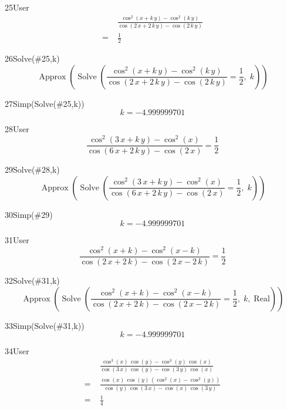 \begin{espr}{25}{User}{\verificata}
\begin{align*}
& \frac{\cos^{2}\!\left(x + k\, y\right) - \cos^{2}\!\left(k\, y\right)}{\cos\!\left(2\, x + 2\, k\, y\right) - \cos\!\left(2\, k\, y\right)} \\
=\;& \frac{1}{2}
\end{align*}
\end{espr}
\begin{espr}{26}{Solve(\#25,k)}{}
\[
\operatorname{Approx}\!\left(\operatorname{Solve}\!\left(\frac{\cos^{2}\!\left(x + k\, y\right) - \cos^{2}\!\left(k\, y\right)}{\cos\!\left(2\, x + 2\, k\, y\right) - \cos\!\left(2\, k\, y\right)} = \frac{1}{2},\; k\right)\right)
\]
\end{espr}
\begin{espr}{27}{Simp(Solve(\#25,k))}{}
\[
k = -4.999999701
\]
\end{espr}
\begin{espr}{28}{User}{\verificata}
\[
\frac{\cos^{2}\!\left(3\, x + k\, y\right) - \cos^{2}\!\left(x\right)}{\cos\!\left(6\, x + 2\, k\, y\right) - \cos\!\left(2\, x\right)} = \frac{1}{2}
\]
\end{espr}
\begin{espr}{29}{Solve(\#28,k)}{}
\[
\operatorname{Approx}\!\left(\operatorname{Solve}\!\left(\frac{\cos^{2}\!\left(3\, x + k\, y\right) - \cos^{2}\!\left(x\right)}{\cos\!\left(6\, x + 2\, k\, y\right) - \cos\!\left(2\, x\right)} = \frac{1}{2},\; k\right)\right)
\]
\end{espr}
\begin{espr}{30}{Simp(\#29)}{}
\[
k = -4.999999701
\]
\end{espr}
\begin{espr}{31}{User}{\verificata}
\[
\frac{\cos^{2}\!\left(x + k\right) - \cos^{2}\!\left(x - k\right)}{\cos\!\left(2\, x + 2\, k\right) - \cos\!\left(2\, x - 2\, k\right)} = \frac{1}{2}
\]
\end{espr}
\begin{espr}{32}{Solve(\#31,k)}{}
\[
\operatorname{Approx}\!\left(\operatorname{Solve}\!\left(\frac{\cos^{2}\!\left(x + k\right) - \cos^{2}\!\left(x - k\right)}{\cos\!\left(2\, x + 2\, k\right) - \cos\!\left(2\, x - 2\, k\right)} = \frac{1}{2},\; k,\; \mathrm{Real}\right)\right)
\]
\end{espr}
\begin{espr}{33}{Simp(Solve(\#31,k))}{}
\[
k = -4.999999701
\]
\end{espr}
\begin{espr}{34}{User}{\verificata}
\begin{align*}
& \frac{\cos^{3}\!\left(x\right)\, \cos\!\left(y\right) - \cos^{3}\!\left(y\right)\, \cos\!\left(x\right)}{\cos\!\left(3\, x\right)\, \cos\!\left(y\right) - \cos\!\left(3\, y\right)\, \cos\!\left(x\right)} \\
=\;& \frac{\cos\!\left(x\right)\, \cos\!\left(y\right)\, \left(\cos^{2}\!\left(x\right) - \cos^{2}\!\left(y\right)\right)}{\cos\!\left(y\right)\, \cos\!\left(3\, x\right) - \cos\!\left(x\right)\, \cos\!\left(3\, y\right)} \\
=\;& \frac{1}{4}
\end{align*}
\end{espr}
